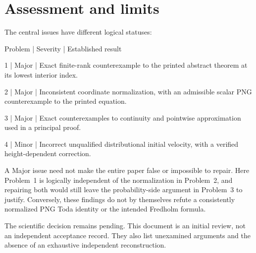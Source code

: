 \documentclass[10pt]{article}
\begin{document}
\section*{Assessment and limits}
The central issues have different logical statuses:\par
Problem | Severity | Established result\par
1 | Major | Exact finite-rank counterexample to the printed abstract theorem at its lowest interior index.\par
2 | Major | Inconsistent coordinate normalization, with an admissible scalar PNG counterexample to the printed equation.\par
3 | Major | Exact counterexamples to continuity and pointwise approximation used in a principal proof.\par
4 | Minor | Incorrect unqualified distributional initial velocity, with a verified height-dependent correction.\par
A Major issue need not make the entire paper false or impossible to repair. Here Problem 1 is logically independent of the normalization in Problem 2, and repairing both would still leave the probability-side argument in Problem 3 to justify. Conversely, these findings do not by themselves refute a consistently normalized PNG Toda identity or the intended Fredholm formula.\par
The scientific decision remains pending. This document is an initial review, not an independent acceptance record. They also list unexamined arguments and the absence of an exhaustive independent reconstruction.\par
\end{document}
